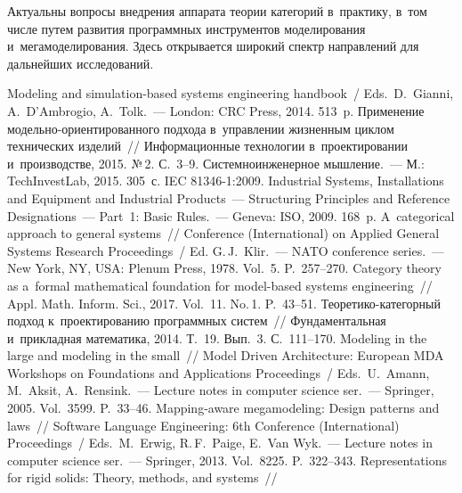 \begin{multicols}{2}
Актуальны вопросы 
внедрения аппарата теории категорий в~практику, в~том числе путем развития 
программных инструментов моделирования и~мегамоделирования. Здесь 
открывается широкий спектр направлений для дальнейших исследований.
   
{\small\frenchspacing
 {%
 \begin{thebibliography}{99}
Modeling and simulation-based systems engineering handbook~/
Eds.\ D.~Gianni,  A.~D'Ambrogio, A.~Tolk.~--- London: CRC Press, 2014. 513~p.
 Применение модельно-ори\-ен\-ти\-ро\-ван\-но\-го подхода 
в~управ\-ле\-нии жизненным циклом технических изделий~// Информационные технологии 
в~проектировании и~производстве, 2015. №\,2. С.~3--9.
 Системноинженерное мышление.~--- М.: TechInvestLab, 2015. 305~с.
IEC 81346-1:2009. Industrial Systems, Installations and Equipment and Industrial Products~--- 
Structuring Principles and Reference Designations~--- Part~1: Basic Rules.~--- Geneva: ISO, 2009. 
168~p.
 A~categorical approach to general systems~// 
 Conference (International) on Applied General Systems 
Research Proceedings~/
Ed. G.\,J.~Klir.~--- NATO conference series.~--- New York, NY, USA: Plenum 
Press, 1978. Vol.~5. P.~257--270.
 Category theory as a~formal mathematical foundation for  
model-based systems engineering~// Appl. Math. Inform. Sci., 2017. Vol.~11. No.\,1. P.~43--51.
 Тео\-ре\-ти\-ко-ка\-те\-гор\-ный подход к~проектированию программных 
сис\-тем~// Фундаментальная и~прикладная математика, 2014. Т.~19. Вып.~3. С.~111--170.
 Modeling in the large 
and modeling in the small~// Model Driven Architecture: European MDA Workshops on 
Foundations and Applications Proceedings~/
Eds.\ U.~A{\!\ptb{\ss}}mann, M.~Aksit,  A.~Rensink.~--- 
Lecture notes in computer science ser.~--- Springer, 2005. Vol.~3599. 
P.~33--46.
 Mapping-aware mega\-mod\-eling: Design patterns and 
laws~// Software Language Engineering: 6th Conference (International) Proceedings~/
Eds.\ M.~Erwig, R.\,F.~Paige, E.~Van Wyk.~--- 
Lecture notes  in computer science ser.~--- Springer, 2013. Vol.~8225. P.~322--343.
 Representations for rigid solids: Theory, methods, and systems~// 

\end{thebibliography}}}
\end{multicols}
